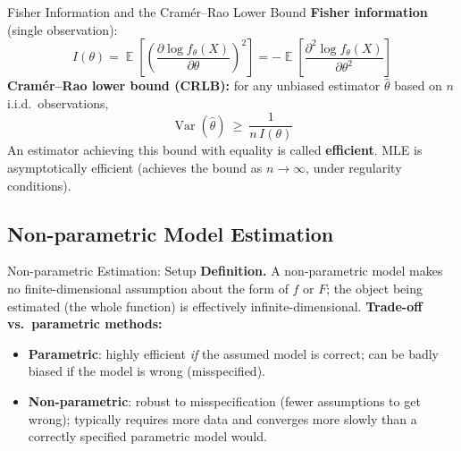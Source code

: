 \documentclass[11pt,aspectratio=169]{beamer}
\newcommand{\Var}{\operatorname{Var}}
\newcommand{\E}{\operatorname{\mathbb{E}}}
\newcommand{\Def}[1]{\textbf{Definition.} #1}
\begin{document}
\begin{frame}{Fisher Information and the Cram\'er--Rao Lower Bound}
\textbf{Fisher information} (single observation):
\[
    I(\theta)=\E\left[\left(\frac{\partial\log f_\theta(X)}{\partial\theta}\right)^2\right]
    = -\E\left[\frac{\partial^2\log f_\theta(X)}{\partial\theta^2}\right]
\]
\textbf{Cram\'er--Rao lower bound (CRLB):} for any unbiased estimator
$\hat\theta$ based on $n$ i.i.d.\ observations,
\[
    \Var(\hat\theta)\ \ge\ \frac{1}{n\,I(\theta)}
\]
An estimator achieving this bound with equality is called
\textbf{efficient}. MLE is asymptotically efficient (achieves the bound as
$n\to\infty$, under regularity conditions).
\end{frame}

\subsection{Non-parametric Model Estimation}

\begin{frame}{Non-parametric Estimation: Setup}
\Def{A non-parametric model makes no finite-dimensional assumption about
the form of $f$ or $F$; the object being estimated (the whole function) is
effectively infinite-dimensional.}
\textbf{Trade-off vs.\ parametric methods:}
\begin{itemize}
    \item \textbf{Parametric}: highly efficient \emph{if} the assumed model
          is correct; can be badly biased if the model is wrong
          (misspecified).
    \item \textbf{Non-parametric}: robust to misspecification (fewer
          assumptions to get wrong); typically requires more data and
          converges more slowly than a correctly specified parametric
          model would.
\end{itemize}
\end{frame}
\end{document}

